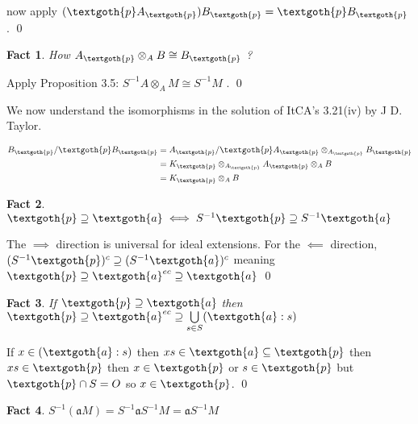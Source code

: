 \documentclass{article}
\newcommand{\mf}{\mathfrak}
\newcommand{\aaa}{\mf a}
\newtheorem{theorem}{Fact}[section]
\begin{document}
\noindent
now apply $(\textgoth{p} A_\textgoth{p}) B_\textgoth{p} = \textgoth{p} B_\textgoth{p}$ . 
\qed

\vspace{1.5em}
\begin{theorem}
How $A_\textgoth{p} \otimes_A B \cong B_\textgoth{p}$ ?
\end{theorem}

Apply Proposition 3.5: $S^{-1}A \otimes_A M \cong S^{-1}M$ . 
\qed

\vspace{1em}
We now understand the isomorphisms in the solution of ItCA's 3.21(iv) by J D. Taylor.

\begin{equation*}
\begin{split}
 B_\textgoth{p}/\textgoth{p}B_\textgoth{p} 
 & = A_\textgoth{p}/\textgoth{p}A_\textgoth{p} 
 \otimes_{A_\textgoth{p}} B_\textgoth{p} \\ 
 & = K_\textgoth{p} \otimes_{A_\textgoth{p}} A_\textgoth{p} \otimes_A B \\
 & = K_\textgoth{p} \otimes_A B
\end{split}
\end{equation*}

\bigskip
\begin{theorem}
$\textgoth{p} \supseteq \textgoth{a} \iff S^{-1}\textgoth{p} \supseteq S^{-1}\textgoth{a}$
\end{theorem}

\noindent
The $\implies$ direction is universal for ideal extensions. For the $\impliedby$ direction, 
$(S^{-1}\textgoth{p})^c \supseteq (S^{-1}\textgoth{a})^c$ meaning $\textgoth{p} \supseteq \textgoth{a}^{ec} \supseteq \textgoth{a}$
\qed

\vspace{1.5em}
\begin{theorem}
If $\textgoth{p} \supseteq \textgoth{a}$ then $\textgoth{p} \supseteq \textgoth{a}^{ec} \supseteq \bigcup\limits_{s \in S} (\textgoth{a}:s)$
\end{theorem}

\noindent
If $x \in (\textgoth{a}:s)$ then $xs \in \textgoth{a} \subseteq \textgoth{p}$ then $xs \in \textgoth{p}$ then $x \in \textgoth{p}$ or $s \in \textgoth{p}$ but $\textgoth{p} \cap S = O$ so $x \in \textgoth{p}$. 
\qed

\vspace{1.5em}
\begin{theorem}
$S^{-1}(\aaa M) = S^{-1}\aaa S^{-1}M = \aaa S^{-1}M$
\end{theorem}
\end{document}
